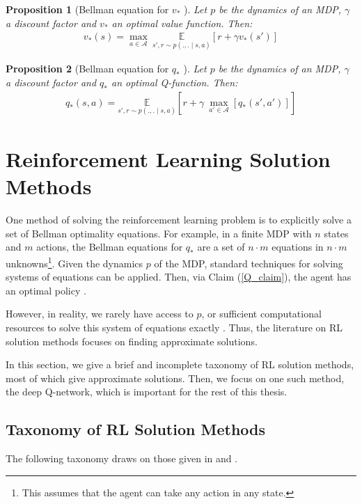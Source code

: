 \documentclass[11pt, a4paper, bibliography=totoc]{report}
\newtheorem{proposition}{Proposition}
\begin{document}
\begin{proposition}[Bellman equation for $ v_* $ {\cite[p.~63]{Sutton2018}}]
	Let $ p $ be the dynamics of an MDP, $ \gamma $ a discount factor and $ v_* $ an optimal value function. Then:
	\begin{align}
	v_*(s) = \max_{a \in \mathcal{A}} ~ \underset{s', r \sim p(., . \mid s, a)}{\mathbb{E}} \left[ r + \gamma v_*(s') \right]
	\end{align}
\end{proposition}

\begin{proposition}[Bellman equation for $ q_* $ {\cite[p.~63]{Sutton2018}}] \label{bellman_q*}
	Let $ p $ be the dynamics of an MDP, $ \gamma $ a discount factor and $ q_* $ an optimal Q-function. Then:
	\begin{align}
	q_*(s, a) = \underset{s', r \sim p(., . \mid s, a)}{\mathbb{E}} \left[ r + \gamma ~ \underset{a' \in \mathcal{A}}{\max}\left[q_*(s', a')\right] \right]
	\end{align}
\end{proposition}

\section{Reinforcement Learning Solution Methods} \label{RL_solution_methods}
One method of solving the reinforcement learning problem is to explicitly solve a set of Bellman optimality equations. For example, in a finite MDP with $ n $ states and $ m $ actions, the Bellman equations for $ q_* $ are a set of $ n\cdot m $ equations in $ n\cdot m $ unknowns\footnote{This assumes that the agent can take any action in any state.}. Given the dynamics $ p $ of the MDP, standard techniques for solving systems of equations can be applied. Then, via Claim (\ref{Q_claim}), the agent has an optimal policy \cite[p.~64]{Sutton2018}.

However, in reality, we rarely have access to $ p $, or sufficient computational resources to solve this system of equations exactly \cite[p.~66]{Sutton2018}. Thus, the literature on RL solution methods focuses on finding approximate solutions.

In this section, we give a brief and incomplete taxonomy of RL solution methods, most of which give approximate solutions. Then, we focus on one such method, the deep Q-network, which is important for the rest of this thesis.

\subsection{Taxonomy of RL Solution Methods} \label{subsection:rl_taxonomy}
The following taxonomy draws on those given in \cite{Sutton2018} and \cite{Achiam2019}.
\end{document}

